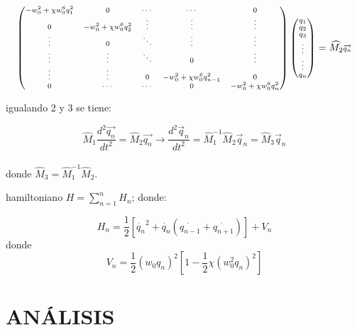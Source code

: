 \documentclass[11pt,letterpaper,twocolumn]{article}
\begin{document}
$${\fontsize{7}{7}\selectfont
\begin{pmatrix} { -w }_{ 0 }^{ 2 }+\chi { w }_{ 0 }^{ 6 }{ q }_{ 1 }^{ 2 } & 0 & \cdots  & \cdots  & 0 \\ 0 & { -w }_{ 0 }^{ 2 }+\chi { w }_{ 0 }^{ 6 }{ q }_{ 2 }^{ 2 } & \vdots  & \vdots  & \vdots  \\ \vdots  & 0 & \ddots  & \vdots  & \vdots  \\ \vdots  & \vdots  & \ddots  & 0 & \vdots  \\ \vdots  & \vdots  & 0 & { -w }_{ 0 }^{ 2 }+\chi { w }_{ 0 }^{ 6 }{ q }_{ n-1 }^{ 2 } & 0 \\ 0 & \cdots  & \cdots  & 0 & { -w }_{ 0 }^{ 2 }+\chi { w }_{ 0 }^{ 6 }{ q }_{ n }^{ 2 } \end{pmatrix}\begin{pmatrix} { q }_{ 1 } \\ { q }_{ 2 } \\ { q }_{ 3 } \\ \vdots  \\ \vdots  \\ { q }_{ n } \end{pmatrix}=\widehat { { M }_{ 2 } } \overrightarrow { { q }_{ n } }  }$$

igualando 2 y 3 se tiene:

\begin{equation}
\widehat{M}_{1}\frac{d^{2}\overrightarrow { { q }_{ n } } }{dt^{2}}=\widehat{M}_{2}\overrightarrow { { q }_{ n } }  \rightarrow \frac{d^{2}\overrightarrow{q}_{n}}{dt^{2}}=\widehat{M}_{1}^{-1}\widehat{M}_{2} \overrightarrow{q}_{n}=\widehat{M}_{3}\overrightarrow{q}_{n}
\end{equation}
\\
donde $\widehat{M}_{3}=\widehat{M}_{1}^{-1}\widehat{M}_{2} $.

hamiltoniano $H= \sum_{n=1}^{n} H_{n}$; donde:

$$H_{n}=\frac{1}{2} \left[\dot{{q}_{n}}^{2}+\dot{{q}_{n}}\left(\dot{{q}_{n-1}}+\dot{{q}_{n+1}}\right)\right]+V_{n}$$
donde 
$$V_{n}= \frac{1}{2}\left(w_{0}q_{n}\right)^{2}\left[
1-\frac{1}{2}\chi \left(w_{0}^{2}q_{n}\right)^{2}\right] $$
\section{\normalsize{ANÁLISIS}}
\end{document}
